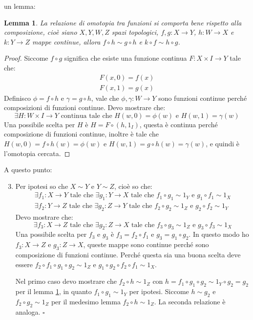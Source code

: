 \documentclass[10pt]{scrartcl}
\newtheorem{lemma}[section]{Lemma}
\begin{document}
un lemma:
\begin{lemma}
  \label{lemma:composizione_funzioni_omotopia}
  La relazione di omotopia tra funzioni si comporta bene
  rispetto alla composizione, cioè siano $ X, Y, W, Z $
  spazi topologici, $ f, g \colon X \to Y $,
  $ h \colon W \to X $ e $ k \colon Y \to Z $ mappe continue,
  allora $ f \circ h \sim g \circ h $ e $ k \circ f \sim h \circ g $.
\end{lemma}
\begin{proof}
  Siccome $ f \circ g $ significa che esiste una funzione
  continua $ F \colon X \times I \to Y $ tale che:
  \begin{align*}
    F(x, 0) = f(x) \\
    F(x, 1) = g(x)
  \end{align*}
  Definisco $ \phi = f \circ h $ e $ \gamma = g \circ h $, vale che
  $ \phi, \gamma \colon W \to Y $ sono funzioni continue perché
  composizioni di funzioni continue. Devo mostrare che:
  \[
    \exists H \colon W \times I \to Y \text{ continua tale che }
    H(w, 0) = \phi(w) \text{ e } H(w, 1) = \gamma(w)
  \]
  Una possibile scelta per $ H $ è $ H = F \circ (h, 1_I) $,
  questa è continua perché composizione di funzioni
  continue, inoltre è tale che $ H(w, 0) = f \circ h (w) = \phi(w) $
  e $ H(w, 1) = g \circ h (w) = \gamma(w) $, e quindi è l'omotopia
  cercata.
\end{proof}
A questo punto:
\begin{enumerate}
  \setcounter{enumi}{2}
\item Per ipotesi so che $ X \sim Y $ e $ Y \sim Z $, cioè
  so che:
  \begin{gather*}
    \exists f_1 \colon X \to Y \text{ tale che } \exists g_1 \colon Y \to X \text{ tale che }
    f_1 \circ g_1 \sim 1_Y \text{ e } g_1 \circ f_1 \sim 1_X \\
    \exists f_2 \colon Y \to Z \text{ tale che } \exists g_2 \colon Z \to Y \text{ tale che }
    f_2 \circ g_2 \sim 1_Z \text{ e } g_2 \circ f_2 \sim 1_Y
  \end{gather*}
  Devo mostrare che:
  \[
    \exists f_3 \colon X \to Z \text{ tale che } \exists g_2 \colon Z \to X \text{ tale che }
    f_3 \circ g_3 \sim 1_Z \text{ e } g_3 \circ f_3 \sim 1_X
  \]
  Una possibile scelta per $ f_3 $ e $ g_3 $ è $ f_3 = f_2 \circ f_1 $
  e $ g_3 = g_1 \circ g_2 $. In questo modo ho
  $ f_3 \colon X \to Z $ e $ g_3 \colon Z \to X $, queste
  mappe sono continue perché sono composizione
  di funzioni continue.
  Perché questa sia una buona scelta deve essere
  $ f_2 \circ f_1 \circ g_1 \circ g_2 \sim 1_Z $
  e  $  g_1 \circ g_2 \circ f_2 \circ f_1 \sim 1_X $.

  Nel primo caso devo mostrare che $ f_2 \circ h \sim 1_Z $ con
  $ h = f_1 \circ g_1 \circ g_2 \sim 1_Y \circ g_2 = g_2 $ per il lemma
  \ref{lemma:composizione_funzioni_omotopia}, in quanto $ f_1 \circ g_1 \sim 1_Y $
  per ipotesi. Siccome $ h \sim g_2 $ e $ f_2 \circ g_2 \sim 1_Z $ per il medesimo
  lemma $ f_2 \circ h \sim 1_Z $. La seconda relazione è analoga.
\hfill $ \square $
\end{enumerate}
\end{document}
